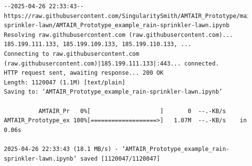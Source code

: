 \documentclass[
  11pt,
  letterpaper,
]{book}
\begin{document}
\begin{verbatim}
--2025-04-26 22:33:43--  https://raw.githubusercontent.com/SingularitySmith/AMTAIR_Prototype/main/data/example_rain-sprinkler-lawn/AMTAIR_Prototype_example_rain-sprinkler-lawn.ipynb
Resolving raw.githubusercontent.com (raw.githubusercontent.com)... 185.199.111.133, 185.199.109.133, 185.199.110.133, ...
Connecting to raw.githubusercontent.com (raw.githubusercontent.com)|185.199.111.133|:443... connected.
HTTP request sent, awaiting response... 200 OK
Length: 1120047 (1.1M) [text/plain]
Saving to: ‘AMTAIR_Prototype_example_rain-sprinkler-lawn.ipynb’

          AMTAIR_Pr   0%[                    ]       0  --.-KB/s               AMTAIR_Prototype_ex 100%[===================>]   1.07M  --.-KB/s    in 0.06s   

2025-04-26 22:33:43 (18.1 MB/s) - ‘AMTAIR_Prototype_example_rain-sprinkler-lawn.ipynb’ saved [1120047/1120047]
\end{verbatim}
\end{document}
